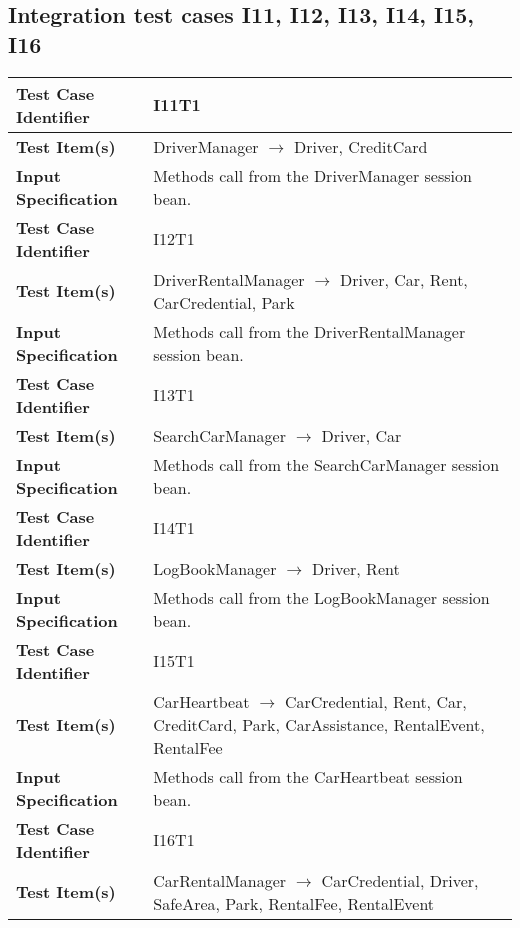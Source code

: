 \subsection {Integration test cases I11, I12, I13, I14, I15, I16 }

\indent

\vspace{1em}

\begin{tabular}{l p{}}
    \hline
    \textbf{Test Case Identifier} & I11T1\\
    \hline
    \textbf{Test Item(s)} & DriverManager $\rightarrow$ Driver, CreditCard \\
    \hline
    \textbf{Input Specification} &  Methods call from the DriverManager session bean. \\
    \hline
    \hline
    \textbf{Test Case Identifier} & I12T1\\
    \hline
    \textbf{Test Item(s)} & DriverRentalManager $\rightarrow$ Driver, Car, Rent, CarCredential, Park \\
    \hline
    \textbf{Input Specification} &  Methods call from the DriverRentalManager session bean. \\
    \hline
    \hline
    \textbf{Test Case Identifier} & I13T1\\
    \hline
    \textbf{Test Item(s)} & SearchCarManager $\rightarrow$ Driver, Car \\
    \hline
    \textbf{Input Specification} &  Methods call from the SearchCarManager session bean. \\
    \hline
    \hline
    \textbf{Test Case Identifier} & I14T1\\
    \hline
    \textbf{Test Item(s)} & LogBookManager $\rightarrow$ Driver, Rent \\
    \hline
    \textbf{Input Specification} &  Methods call from the LogBookManager session bean. \\
    \hline
    \hline
    \textbf{Test Case Identifier} & I15T1\\
    \hline
    \textbf{Test Item(s)} & CarHeartbeat $\rightarrow$ CarCredential, Rent, Car, CreditCard, Park, CarAssistance, RentalEvent, RentalFee \\
    \hline
    \textbf{Input Specification} &  Methods call from the CarHeartbeat session bean. \\
    \hline
    \hline
    \textbf{Test Case Identifier} & I16T1\\
    \hline
    \textbf{Test Item(s)} & CarRentalManager $\rightarrow$ CarCredential, Driver, SafeArea, Park, RentalFee, RentalEvent \\

\end{tabular}
